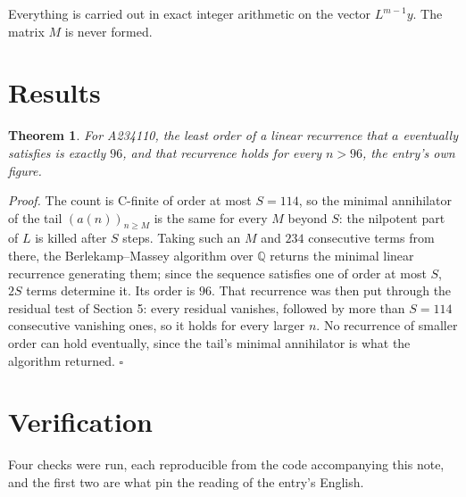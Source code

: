 \documentclass[11pt]{article}
\newtheorem{theorem}{Theorem}
\theoremstyle{definition}
\begin{document}
Everything is carried out in exact integer arithmetic on the vector $L^{m-1}y$. The matrix $M$ is never formed.

\section{Results}

\begin{theorem} For A234110, the least order of a linear recurrence that $a$ eventually satisfies is exactly $96$, and that recurrence holds for every $n > 96$, the entry's own figure.\end{theorem}

{\itshape Proof.} The count is C-finite of order at most $S = 114$, so the minimal annihilator of the tail $(a(n))_{n \ge M}$ is the same for every $M$ beyond $S$: the nilpotent part of $L$ is killed after $S$ steps. Taking such an $M$ and $234$ consecutive terms from there, the Berlekamp--Massey algorithm over $\mathbb{Q}$ returns the minimal linear recurrence generating them; since the sequence satisfies one of order at most $S$, $2S$ terms determine it. Its order is $96$. That recurrence was then put through the residual test of Section 5: every residual vanishes, followed by more than $S = 114$ consecutive vanishing ones, so it holds for every larger $n$. No recurrence of smaller order can hold eventually, since the tail's minimal annihilator is what the algorithm returned. $\square$

\section{Verification}

Four checks were run, each reproducible from the code accompanying this note, and the first two are what pin the reading of the entry's English.
\end{document}
